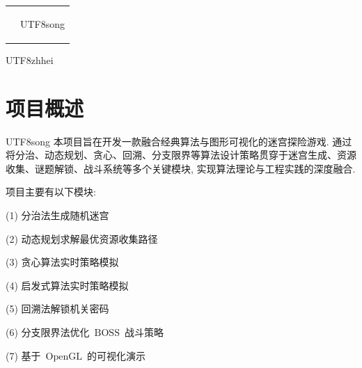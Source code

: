 \documentclass[10.5pt,compsoc]{CjC}
\theoremstyle{mystyle}
\begin{document}
\begin{table}[!t]
\setlength{\tabcolsep}{2pt}
\begin{tabular}{p{0.05cm}p{16.15cm}}
&\begin{CJK*}{UTF8}{song}
\end{CJK*}
\end{tabular}\end{table}
\clearpage\clearpage
\begin{strip}
\vspace {-13mm}
\end{strip}
\linespread{1.15}

\begin{CJK*}{UTF8}{zhhei}
\vskip 1mm
\section{项目概述}
\end{CJK*}

\begin{CJK*}{UTF8}{song}
本项目旨在开发一款融合经典算法与图形可视化的迷宫探险游戏. 
通过将分治、动态规划、贪心、回溯、分支限界等算法设计策略贯穿于迷宫生成、资源收集、谜题解锁、战斗系统等多个关键模块,
实现算法理论与工程实践的深度融合.

项目主要有以下模块:

(1) 分治法生成随机迷宫

(2) 动态规划求解最优资源收集路径

(3) 贪心算法实时策略模拟

(4) 启发式算法实时策略模拟

(5) 回溯法解锁机关密码

(6) 分支限界法优化~$\textrm{BOSS}$~战斗策略

(7) 基于~$\textrm{OpenGL}$~的可视化演示
\end{CJK*}
\end{document}
